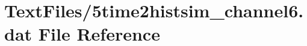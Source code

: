 \hypertarget{5time2histsim__channel6_8dat}{}\section{Text\+Files/5time2histsim\+\_\+channel6.dat File Reference}
\label{5time2histsim__channel6_8dat}
